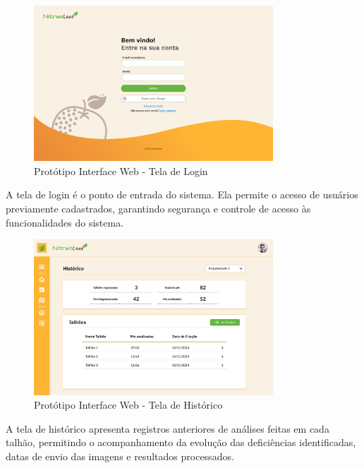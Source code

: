 
\begin{figure}[H]
\centering
\caption{Protótipo Interface Web - Tela de Login}
\label{fig:interface-web-tela-login}
\includegraphics[width=0.8\textwidth]{Images/TelaLogin.png}
\end{figure}

A tela de login é o ponto de entrada do sistema. Ela permite o acesso de usuários
previamente cadastrados, garantindo segurança e controle de acesso às
funcionalidades do sistema.
\medskip


\begin{figure}[H]
\centering
\caption{Protótipo Interface Web - Tela de Histórico}
\label{fig:interface-web-telahistorico-1}
\includegraphics[width=0.8\textwidth]{Images/TelaHistorico-1.png}
\end{figure}

A tela de histórico apresenta registros anteriores de análises feitas em cada
talhão, permitindo o acompanhamento da evolução das deficiências identificadas,
datas de envio das imagens e resultados processados.
\medskip


